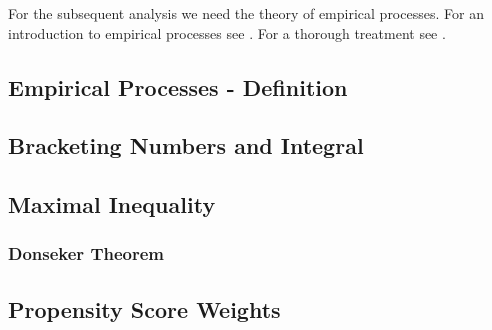For the subsequent analysis we need the theory of empirical processes.
For an introduction to empirical processes see \cite[§19]{Vaart2000}. For a thorough treatment see \cite[§2]{vaart2013}. 
\subsection{Empirical Processes - Definition}
  
\subsection{Bracketing Numbers and Integral}
  
\subsection{Maximal Inequality}
  
\subsubsection{Donseker Theorem}
  
\subsection{Propensity Score Weights}
  
